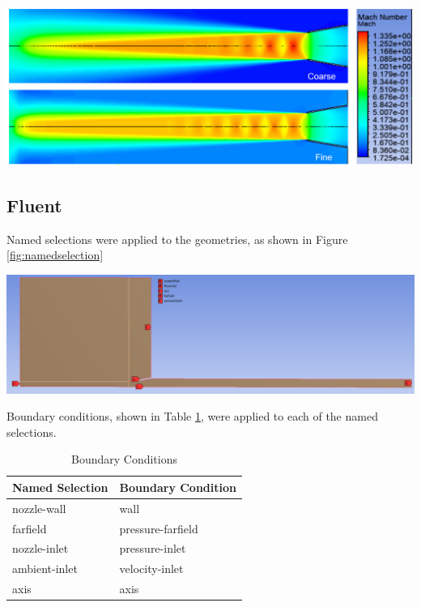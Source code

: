 \documentclass[12pt]{article} %
\begin{document}
\begin{center}
    \includegraphics[width = \linewidth]{GridCompareA_Mach.PNG}
    \label{fig:gridcompareA_Mach}
\end{center}

\subsection{Fluent}\label{section:fluent}
Named selections were applied to the geometries, as shown in Figure \ref{fig:namedselection}

\begin{center}
    \includegraphics[width = \linewidth]{Named_Selections.PNG}
    \label{fig:namedselection}
\end{center}

Boundary conditions, shown in Table \ref{tab:boundary}, were applied to each of the named selections.

\begin{table}[ht]
    \caption{Boundary Conditions}
    \centering
    \begin{tabular}{l|l}
        Named Selection&Boundary Condition\\
        \hline
        nozzle-wall&wall\\
        farfield&pressure-farfield\\
        nozzle-inlet&pressure-inlet\\
        ambient-inlet&velocity-inlet\\
        axis&axis\\
        \hline
    \end{tabular}
    \label{tab:boundary}
\end{table}
\end{document}
